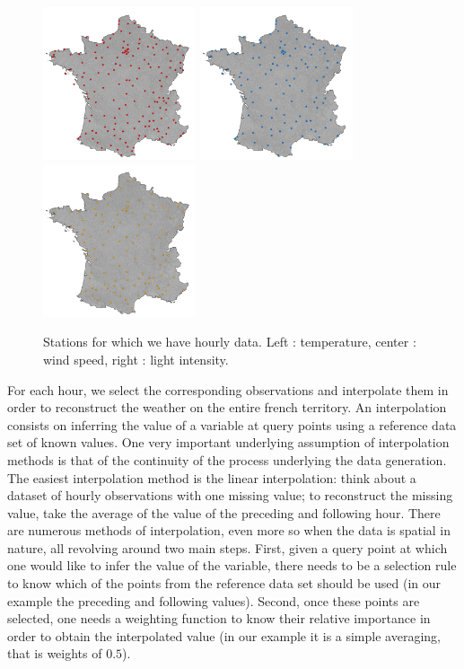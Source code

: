 \begin{figure}[!ht]
\begin{center} \includegraphics[height=45mm]{forqgis/stationstemp.pdf} \hspace{0.05cm}\includegraphics[height=45mm]{forqgis/stationswind.pdf}
\hspace{0.05cm}\includegraphics[height=45mm]{forqgis/stationslum.pdf}
 \end{center}
\caption{Stations for which we have hourly data. Left : temperature, center : wind speed, right : light intensity.}
\label{fig:stations}
\end{figure}

For each hour, we select the corresponding observations and interpolate them in order to reconstruct the weather on the entire french territory. An interpolation consists on inferring the value of a variable at query points using a reference data set of known values. One very important underlying assumption of interpolation methods is that of the continuity of the process underlying the data generation. The easiest interpolation method is the linear interpolation: think about a dataset of hourly observations with one missing value; to reconstruct the missing value, take the average of the value of the preceding and following hour. There are numerous methods of interpolation, even more so when the data is spatial in nature, all revolving around two main steps. First, given a query point at which one would like to infer the value of the variable, there needs to be a selection rule to know which of the points from the reference data set should be used (in our example the preceding and following values). Second, once these points are selected, one needs a weighting function to know their relative importance in order to obtain the interpolated value (in our example it is a simple averaging, that is weights of $0.5$). \\

